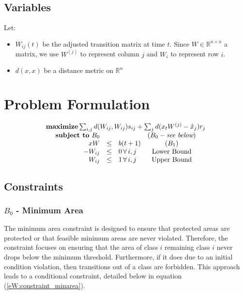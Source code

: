 \documentclass[10pt]{article}
\begin{document}
%
%
\subsection*{Variables}
Let:
\begin{itemize}
\item
$W_{ij}(t)$ be the adjusted transition matrix at time $t$. Since $W \in \mathbb{R}^{n \times n}$ a matrix, we use $W^{(j)}$ to represent column $j$ and $W_i$ to represent row $i$. 

\item
$d(x, x)$ be a distance metric on $\mathbb{R}^n$
\end{itemize}

%
%
\section*{Problem Formulation}

\begin{equation}
\begin{array}{c}
\textbf{maximize} \sum_{i, j}{d(W_{ij}, W_{ij})s_{ij}} + \sum_{j}{d(x_tW^{(j)} - \hat{x}_j)r_j}\\
\begin{array}{rclc}
\textbf{subject to}\,\, B_0 & & & (B_0 - \emph{see below})\\
 xW & \leq & b(t + 1) & (B_1)\\
-W_{ij} & \leq & 0 \,\forall\, i, j & \mbox{Lower Bound}\\
W_{ij} & \leq & 1 \,\forall\, i, j & \mbox{Upper Bound}\\
\end{array}
\end{array}
\end{equation}


\subsection*{Constraints}

%
%
\subsubsection*{$B_0$ - Minimum Area}

The minimum area constraint is designed to ensure that protected areas are protected or that feasible minimum areas are never violated. Therefore, the constraint focuses on ensuring that the area of class $i$ remaining class $i$ never drops below the minimum threshold. Furthermore, if it does due to an initial condition violation, then transitions out of a class are forbidden. This approach leads to a conditional constraint, detailed below in equation (\ref{eW:constraint_minarea}).
\end{document}
